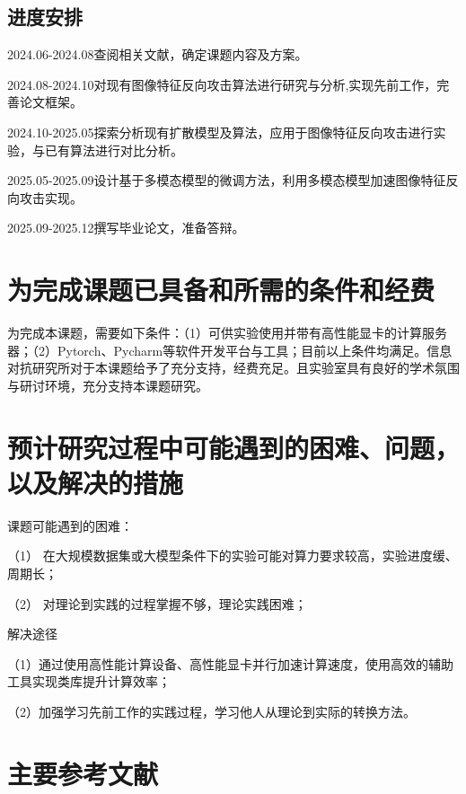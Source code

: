 \subsection{进度安排}
      2024.06-2024.08\quad 查阅相关文献，确定课题内容及方案。
\par  2024.08-2024.10\quad 对现有图像特征反向攻击算法进行研究与分析,实现先前工作，完善论文框架。
\par  2024.10-2025.05\quad 探索分析现有扩散模型及算法，应用于图像特征反向攻击进行实验，与已有算法进行对比分析。
\par  2025.05-2025.09\quad 设计基于多模态模型的微调方法，利用多模态模型加速图像特征反向攻击实现。
\par  2025.09-2025.12\quad 撰写毕业论文，准备答辩。
\section{为完成课题已具备和所需的条件和经费}
为完成本课题，需要如下条件：（1）可供实验使用并带有高性能显卡的计算服务器；（2）Pytorch、Pycharm等软件开发平台与工具；目前以上条件均满足。信息对抗研究所对于本课题给予了充分支持，经费充足。且实验室具有良好的学术氛围与研讨环境，充分支持本课题研究。
\section{预计研究过程中可能遇到的困难、问题，以及解决的措施}
课题可能遇到的困难：
\par （1） 在大规模数据集或大模型条件下的实验可能对算力要求较高，实验进度缓、周期长；
\par （2） 对理论到实践的过程掌握不够，理论实践困难；
\par 解决途径
\par （1）通过使用高性能计算设备、高性能显卡并行加速计算速度，使用高效的辅助工具实现类库提升计算效率；
\par （2）加强学习先前工作的实践过程，学习他人从理论到实际的转换方法。
\section{主要参考文献}



